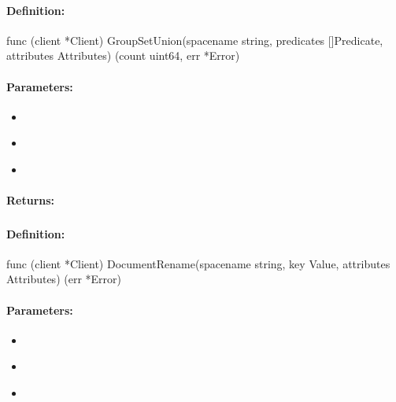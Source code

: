 \paragraph{Definition:}
\begin{gocode}
func (client *Client) GroupSetUnion(spacename string, predicates []Predicate, attributes Attributes) (count uint64, err *Error)
\end{gocode}

\paragraph{Parameters:}
\begin{itemize}[noitemsep]
\item {}\\

\item {}\\

\item {}\\

\end{itemize}

\paragraph{Returns:}


\pagebreak
\subsubsection{}
\label{api:Go:DocumentRename}


\paragraph{Definition:}
\begin{gocode}
func (client *Client) DocumentRename(spacename string, key Value, attributes Attributes) (err *Error)
\end{gocode}

\paragraph{Parameters:}
\begin{itemize}[noitemsep]
\item {}\\

\item {}\\

\item {}\\

\end{itemize}

